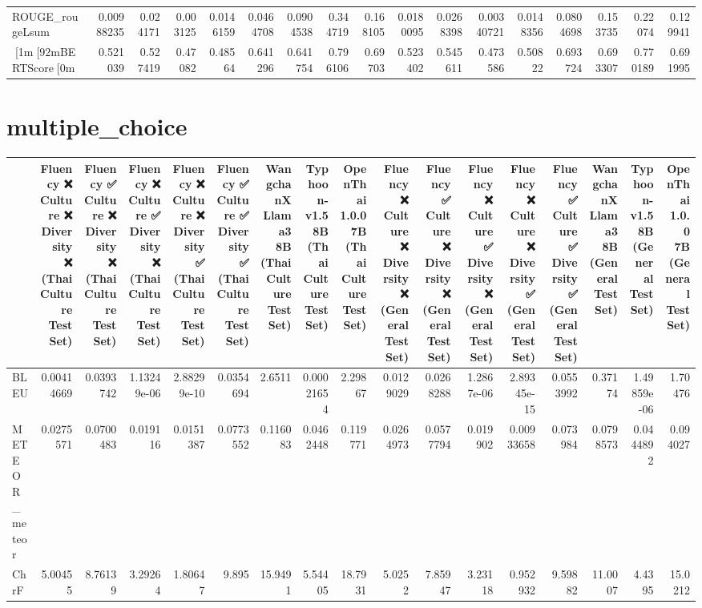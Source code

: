 \begin{tabular}{lrrrrrrrrrrrrrrrr}
 ROUGE_rougeLsum & 0.00988235  & 0.024171   & 0.003125    & 0.0146159 & 0.0464708  &  0.0904538 &  0.344719 &  0.168105  & 0.0180095   & 0.0268398   & 0.00340721  & 0.0148356   & 0.0804698 &  0.153735  &  0.22074  &  0.129941  \\
 [1m[92mBERTScore[0m       & 0.521039    & 0.527419   & 0.47082     & 0.48564   & 0.641296   &  0.641754  &  0.796106 &  0.69703   & 0.523402    & 0.545611    & 0.473586    & 0.50822     & 0.693724  &  0.693307  &  0.770189 &  0.691995  \\
\hline
\end{tabular}\section{multiple_choice}
\begin{tabular}{lrrrrrrrrrrrrrrrr}
\hline
                 &            Fluency ❌
 Culture ❌
 Diversity ❌
(Thai Culture Test Set) &           Fluency ✅
 Culture ❌
 Diversity ❌
(Thai Culture Test Set) &             Fluency ❌
 Culture ✅
 Diversity ❌
(Thai Culture Test Set) &             Fluency ❌
 Culture ❌
 Diversity ✅
(Thai Culture Test Set) &           Fluency ✅
 Culture ✅
 Diversity ✅
(Thai Culture Test Set) &            WangchanX Llama3 8B
(Thai Culture Test Set) &            Typhoon-v1.5 8B
(Thai Culture Test Set) &            OpenThai 1.0.0 7B
(Thai Culture Test Set) &            Fluency ❌
 Culture ❌
 Diversity ❌
(General Test Set) &            Fluency ✅
 Culture ❌
 Diversity ❌
(General Test Set) &            Fluency ❌
 Culture ✅
 Diversity ❌
(General Test Set) &             Fluency ❌
 Culture ❌
 Diversity ✅
(General Test Set) &           Fluency ✅
 Culture ✅
 Diversity ✅
(General Test Set) &            WangchanX Llama3 8B
(General Test Set) &             Typhoon-v1.5 8B
(General Test Set) &            OpenThai 1.0.0 7B
(General Test Set) \\
\hline
 BLEU            & 0.00414669 & 0.0393742 & 1.13249e-06 & 2.88299e-10 & 0.0354694 &  2.6511    & 0.00021654 &  2.29867   & 0.0129029  & 0.0268288  & 1.2867e-06 & 2.89345e-15 & 0.0553992 &  0.37174   & 1.49859e-06 &  1.70476   \\
 METEOR_meteor   & 0.0275571  & 0.0700483 & 0.019116    & 0.0151387   & 0.0773552 &  0.116083  & 0.0462448  &  0.119771  & 0.0264973  & 0.0577794  & 0.019902   & 0.00933658  & 0.073984  &  0.0798573 & 0.0444892   &  0.094027  \\
 ChrF            & 5.00455    & 8.76139   & 3.29264     & 1.80647     & 9.895     & 15.9491    & 5.54405    & 18.7931    & 5.0252     & 7.85947    & 3.23118    & 0.952932    & 9.59882   & 11.0007    & 4.4395      & 15.0212    \\

\end{tabular}
